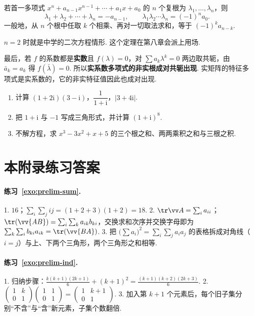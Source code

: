 \begin{theorem}
	若首一多项式 $x^n+a_{n-1}x^{n-1}+\cdots+a_1x+a_0$ 的 $n$ 个复根为 $\lambda_1,\ldots,\lambda_n$，则
	\[\lambda_1+\lambda_2+\cdots+\lambda_n=-a_{n-1},\qquad\lambda_1\lambda_2\cdots\lambda_n=(-1)^na_0.\]
	一般地，从 $n$ 个根中任取 $k$ 个相乘、再对一切取法求和，等于 $(-1)^ka_{n-k}$.
\end{theorem}

$n=2$ 时就是中学的二次方程情形. 这个定理在第八章会派上用场.

最后，若 $f$ 的系数都是\textbf{实数}且 $f(\lambda)=0$，对 $\sum a_k\lambda^k=0$ 两边取共轭，由 $\bar a_k=a_k$ 得 $f(\bar\lambda)=0$. 所以\textbf{实系数多项式的非实根成对共轭出现}. 实矩阵的特征多项式是实系数的，它的非实特征值因此也成对出现.

\begin{exercise}\label{exo:prelim-complex}
	\begin{enumerate}
		\item 计算 $(1+2\mathrm i)(3-\mathrm i)$，$\dfrac1{1+\mathrm i}$，$|3+4\mathrm i|$.
		\item 把 $1+\mathrm i$ 与 $-1$ 写成三角形式，并计算 $(1+\mathrm i)^8$.
		\item 不解方程，求 $x^3-3x^2+x+5$ 的三个根之和、两两乘积之和与三根之积.
	\end{enumerate}
\end{exercise}

\section*{本附录练习答案}

\paragraph*{练习~\ref{exo:prelim-sum}.} 1. $16$；$\sum_i\sum_jij=(1+2+3)(1+2)=18$. 2. $\tr\vv A=\sum_ia_{ii}$；$\tr(\vv{AB})=\sum_i\sum_ka_{ik}b_{ki}$，交换求和次序并交换字母即为 $\sum_k\sum_ib_{ki}a_{ik}=\tr(\vv{BA})$. 3. 把 $\big(\sum a_i\big)^2=\sum_i\sum_ja_ia_j$ 的表格拆成对角线（$i=j$）与上、下两个三角形，两个三角形之和相等.

\paragraph*{练习~\ref{exo:prelim-ind}.} 1. 归纳步骤：$\frac{k(k+1)(2k+1)}6+(k+1)^2=\frac{(k+1)(k+2)(2k+3)}6$. 2. $\begin{pmatrix}1&k\\0&1\end{pmatrix}\begin{pmatrix}1&1\\0&1\end{pmatrix}=\begin{pmatrix}1&k+1\\0&1\end{pmatrix}$. 3. 加入第 $k+1$ 个元素后，每个旧子集分别“不含”与“含”新元素，子集个数翻倍.

